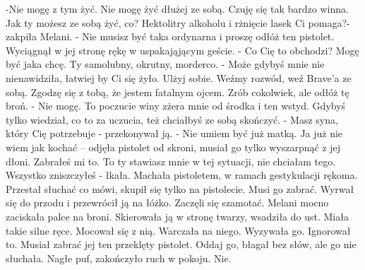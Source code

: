 \documentclass[12pt,a4paper]{book}
\begin{document}
-Nie mogę z tym żyć. Nie mogę żyć dłużej ze sobą. Czuję się tak bardzo winna. Jak ty możesz ze sobą żyć, co? Hektolitry alkoholu i rżnięcie lasek Ci pomaga?- zakpiła Melani. 
- Nie musisz być taka ordynarna i proszę odłóż ten pistolet. 
Wyciągnął w jej stronę rękę w uspakająjącym geście.
- Co Cię to obchodzi? Mogę być jaka chcę. Ty samolubny, okrutny, morderco. 
- Może gdybyś mnie nie nienawidziła, łatwiej by Ci się żyło. Ulżyj sobie. Weźmy rozwód, weź Brave’a ze sobą. Zgodzę się z tobą, że jestem fatalnym ojcem. Zrób cokolwiek, ale odłóż tę broń. 
- Nie mogę. To poczucie winy zżera mnie od środka i ten wstyd. Gdybyś tylko wiedział, co to za uczucia, też chciałbyś ze sobą skończyć. 
- Masz syna, który Cię potrzebuje - przekonywał ją. 
- Nie umiem być już matką. Ja już nie wiem jak kochać – odjęła pistolet od skroni, musiał go tylko wyszarpnąć z jej dłoni. Zabrałeś mi to. To ty stawiasz mnie w tej sytuacji, nie chciałam tego. Wszystko zniszczyłeś - łkała.
Machała pistoletem, w ramach gestykulacji rękoma. Przestał słuchać co mówi, skupił się tylko na pistolecie. Musi go zabrać. 
Wyrwał się do przodu i przewrócił ją na łóżko. Zaczęli się szamotać. Melani mocno zaciskała palce na broni. Skierowała ją w stronę twarzy, wsadziła do ust. Miała takie silne ręce. Mocował się z nią. Warczała na niego. Wyzywała go. Ignorował to. Musiał zabrać jej ten przeklęty pistolet. Oddaj go, błagał bez słów, ale go nie słuchała. 
Nagłe puf, zakończyło ruch w pokoju. 
Nie.
\end{document}
